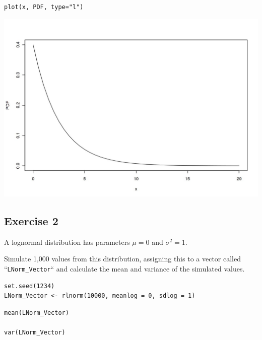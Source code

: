 \documentclass[a4paper,12pt]{article}
\begin{document}
\newpage 

\begin{framed} \begin{verbatim}
plot(x, PDF, type="l")
\end{verbatim}\end{framed}


\includegraphics[scale=0.4]{00-A2/images/output_17_0.jpeg}


\newpage 
\subsection*{Exercise  2}

A lognormal distribution has parameters $\mu = 0$ and $\sigma^2 = 1$.


\noindent Simulate 1,000 values from this distribution, assigning this to a vector called ``\texttt{LNorm\_Vector}`` and calculate the mean and variance of the simulated values. 




\begin{framed} \begin{verbatim}
set.seed(1234)
LNorm_Vector <- rlnorm(10000, meanlog = 0, sdlog = 1)
\end{verbatim}\end{framed}
\begin{framed} \begin{verbatim}
mean(LNorm_Vector) 

var(LNorm_Vector) 
\end{verbatim}\end{framed}
\end{document}
